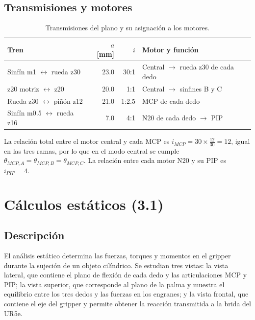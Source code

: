 \documentclass[11pt,letterpaper]{article}
\begin{document}
\subsection{Transmisiones y motores}
\begin{table}[H]
\centering
\begin{tabular}{|l|r|r|l|}
\hline
\textbf{Tren} & \textbf{$a$ [mm]} & \textbf{$i$} & \textbf{Motor y función} \\ \hline
Sinfín m1 $\leftrightarrow$ rueda z30 & 23.0 & 30:1 & Central $\rightarrow$ rueda z30 de cada dedo \\ \hline
z20 motriz $\leftrightarrow$ z20 & 20.0 & 1:1 & Central $\rightarrow$ sinfines B y C \\ \hline
Rueda z30 $\leftrightarrow$ piñón z12 & 21.0 & 1:2.5 & MCP de cada dedo \\ \hline
Sinfín m0.5 $\leftrightarrow$ rueda z16 & 7.0 & 4:1 & N20 de cada dedo $\rightarrow$ PIP \\ \hline
\end{tabular}
\caption{Transmisiones del plano y su asignación a los motores.}
\label{tab:trenes}
\end{table}

La relación total entre el motor central y cada MCP es $i_{MCP} = 30 \times \frac{12}{30} = 12$, igual en las tres ramas, por lo que en el modo central se cumple $\theta_{MCP,A} = \theta_{MCP,B} = \theta_{MCP,C}$. La relación entre cada motor N20 y su PIP es $i_{PIP} = 4$.

\section{Cálculos estáticos (3.1)}
\subsection{Descripción}
El análisis estático determina las fuerzas, torques y momentos en el gripper durante la sujeción de un objeto cilíndrico. Se estudian tres vistas: la vista lateral, que contiene el plano de flexión de cada dedo y las articulaciones MCP y PIP; la vista superior, que corresponde al plano de la palma y muestra el equilibrio entre los tres dedos y las fuerzas en los engranes; y la vista frontal, que contiene el eje del gripper y permite obtener la reacción transmitida a la brida del UR5e.
\end{document}
